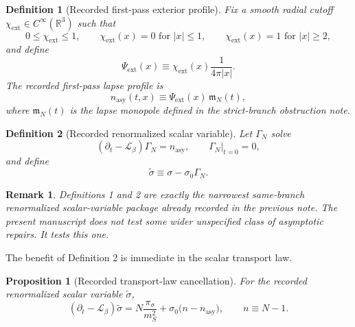 \documentclass[11pt]{article}
\newcommand{\Ell}{\mathcal{L}}
\newtheorem{definition}{Definition}
\newtheorem{proposition}{Proposition}
\newtheorem{remark}{Remark}
\begin{document}
\begin{definition}[Recorded first-pass exterior profile]
Fix a smooth radial cutoff \(\chi_{\mathrm{ext}}\in C^\infty(\mathbb R^3)\) such that
\[
0\le \chi_{\mathrm{ext}}\le 1,
\qquad
\chi_{\mathrm{ext}}(x)=0 \text{ for } |x|\le 1,
\qquad
\chi_{\mathrm{ext}}(x)=1 \text{ for } |x|\ge 2,
\]
and define
\begin{equation}
\Psi_{\mathrm{ext}}(x)
\equiv
\chi_{\mathrm{ext}}(x)\frac{1}{4\pi|x|}.
\label{eq:Psi}
\end{equation}
The recorded first-pass lapse profile is
\begin{equation}
n_{\mathrm{asy}}(t,x)
\equiv
\Psi_{\mathrm{ext}}(x)\,\mathfrak m_N(t),
\label{eq:nasy}
\end{equation}
where \(\mathfrak m_N(t)\) is the lapse monopole defined in the strict-branch obstruction note.
\end{definition}

\begin{definition}[Recorded renormalized scalar variable]
Let \(\Gamma_N\) solve
\begin{equation}
(\partial_t-\Ell_\beta)\Gamma_N
=
n_{\mathrm{asy}},
\qquad
\Gamma_N|_{t=0}=0,
\label{eq:Gamma}
\end{equation}
and define
\begin{equation}
\widetilde{\sigma}
\equiv
\sigma-\sigma_0\Gamma_N.
\label{eq:sigmatilde}
\end{equation}
\end{definition}

\begin{remark}
Definitions 1 and 2 are exactly the narrowest same-branch renormalized scalar-variable package already recorded in the previous note. The present manuscript does not test some wider unspecified class of asymptotic repairs. It tests this one.
\end{remark}

The benefit of Definition 2 is immediate in the scalar transport law.

\begin{proposition}[Recorded transport-law cancellation]
For the recorded renormalized scalar variable \(\widetilde{\sigma}\),
\begin{equation}
(\partial_t-\Ell_\beta)\widetilde{\sigma}
=
N\frac{\pi_\sigma}{m_S^2}
+ \sigma_0\bigl(n-n_{\mathrm{asy}}\bigr),
\qquad
n\equiv N-1.
\label{eq:sigmatildeeq}
\end{equation}
\end{proposition}
\end{document}
